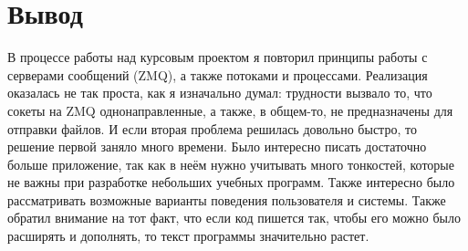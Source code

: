 \section{Вывод}

В процессе работы над курсовым проектом я повторил принципы работы с серверами сообщений (ZMQ), а также потоками и процессами. Реализация оказалась не так проста, как я изначально думал: трудности вызвало то, что сокеты на ZMQ однонаправленные, а также, в общем-то, не предназначены для отправки файлов. И если вторая проблема решилась довольно быстро, то решение первой заняло много времени. Было интересно писать достаточно больше приложение, так как в неём нужно учитывать много тонкостей, которые не важны при разработке небольших учебных программ. Также интересно было рассматривать возможные варианты поведения пользователя и системы. Также обратил внимание на тот факт, что если код пишется так, чтобы его можно было расширять и дополнять, то текст программы значительно растет.

